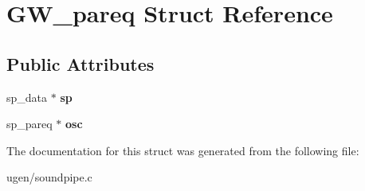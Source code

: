\hypertarget{structGW__pareq}{}\section{G\+W\+\_\+pareq Struct Reference}
\label{structGW__pareq}
\subsection*{Public Attributes}
\begin{DoxyCompactItemize}
\item 
\hypertarget{structGW__pareq_a9b93437eb318f308608a7aa17fa986d6}{}\label{structGW__pareq_a9b93437eb318f308608a7aa17fa986d6} 
sp\+\_\+data $\ast$ {\bfseries sp}
\item 
\hypertarget{structGW__pareq_a172442fbc266b48acf4b05ca89b8c54c}{}\label{structGW__pareq_a172442fbc266b48acf4b05ca89b8c54c} 
sp\+\_\+pareq $\ast$ {\bfseries osc}
\end{DoxyCompactItemize}


The documentation for this struct was generated from the following file\+:\begin{DoxyCompactItemize}
\item 
ugen/soundpipe.\+c\end{DoxyCompactItemize}
